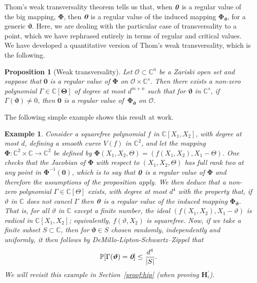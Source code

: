 \documentclass[a4paper]{article}
\def\bz{\textit{\textbf{0}}}
\def\Thetab{\bm{\Theta}}
\def\thetab{\bm{\vartheta}}
\def\vt{\vartheta}
\def\dt{s}
\def\C{\mathbb{C}}
\newtheorem{ex}[theorem]{Example}
\newtheorem{prop}[theorem]{Proposition}
\begin{document}
Thom’s weak transversality theorem tells us that, when $\bz$ is a regular value of the big mapping, $\bm \Phi$, then $\bz$ is a regular value of the induced mapping $\bm \Phi_{\bm \vt}$, for a generic $\bm \vt$. Here, we are dealing with the particular case of transversality to a point, which we have rephrased entirely in terms of regular and critical values. We have developed a quantitative version of Thom’s weak transversality, which is the following.

\begin{prop} [Weak transversality]\label{prop:weak_t}
Let $\mathscr{O} \subset \C^n$ be a Zariski open set and suppose that $\bm 0$ is a regular value of $\bm\Phi$ on $\mathscr{O} \times \C^{s}$. Then there
    exists a non-zero polynomial $\Gamma \in \C[\Thetab]$ of degree at
    most $d^{m+n}$ such that for $\thetab$ in $\C^\dt$, if
    $\Gamma(\thetab)\ne 0$, then $\bm 0$ is a regular value
    of~$\bm\Phi_{\thetab}$ on $\mathscr{O}$.
\end{prop}
\noindent 
The following simple example shows this result at work. 
%
\begin{ex}
Consider a
squarefree polynomial $f$ in $\C[X_1,X_2]$, with degree at most $d$, defining a smooth curve  $V(f)$ in
$\C^2$, and let the mapping $\bm\Phi:\C^2\times \C \to \C^2$ be
defined by $\bm\Phi(X_1,X_2,\Theta) = (f(X_1,X_2), X_1-\Theta)$. One
checks that the Jacobian of $\bm\Phi$ with respect to
$(X_1,X_2,\Theta)$ has full rank two at any point in $\bm\Phi^{-1}(\bm 0)$, which is to say that $\bz$ is a regular value of $\bm \Phi$ and therefore the assumptions of the proposition apply. We then deduce that a non-zero polynomial $\Gamma \in \C[\Theta]$ exists, with degree at most $d^{4}$ with the property that, if $\vartheta$ in $\C$ does not cancel $\Gamma$ then $\bz$ is a regular value of the induced mapping $\bm \Phi_{\bm \vt}$. That is, for all $\vartheta$ in $\C$
except a finite number, the ideal $(f(X_1,X_2), X_1-\vartheta)$ is
radical in $\C[X_1,X_2]$; equivalently, $f(\vartheta, X_2)$ is
squarefree. Now, if we take a finite subset $S \subset \C$, then for $\bm \vt \in S$ chosen randomly, independently and uniformly, it then follows by DeMillo-Lipton-Schwartz–Zippel that 
\[
\mathbb{P}[\Gamma(\bm \vt) = \bz] \leq \frac{d^4}{|S|}.
\]
We will revisit this example in Section~\ref{proof:hip} (when proving $\bm H_i^{'}$).
\end{ex}
%


\end{document}

